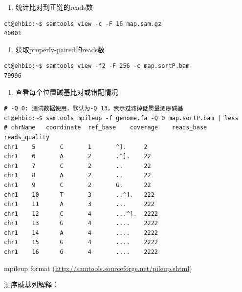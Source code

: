 \documentclass[]{article}
\providecommand{\tightlist}{%
  \setlength{\itemsep}{0pt}\setlength{\parskip}{0pt}}
\numberwithin{figure}{section}
\numberwithin{table}{section}
\begin{document}
\begin{enumerate}
\def\labelenumi{\arabic{enumi}.}
\setcounter{enumi}{8}
\tightlist
\item
  统计比对到正链的reads数
\end{enumerate}

\begin{verbatim}
ct@ehbio:~$ samtools view -c -F 16 map.sam.gz
40001
\end{verbatim}

\begin{enumerate}
\def\labelenumi{\arabic{enumi}.}
\setcounter{enumi}{9}
\tightlist
\item
  获取properly-paired的reads数
\end{enumerate}

\begin{verbatim}
ct@ehbio:~$ samtools view -f2 -F 256 -c map.sortP.bam
79996
\end{verbatim}

\begin{enumerate}
\def\labelenumi{\arabic{enumi}.}
\setcounter{enumi}{10}
\tightlist
\item
  查看每个位置碱基比对或错配情况
\end{enumerate}

\begin{verbatim}
# -Q 0: 测试数据使用，默认为-Q 13，表示过滤掉低质量测序碱基
ct@ehbio:~$ samtools mpileup -f genome.fa -Q 0 map.sortP.bam | less
# chrName	coordinate	ref_base	coverage	reads_base	reads_quality
chr1    5       C       1       ^].     2
chr1    6       A       2       .^].    22
chr1    7       C       2       ..      22
chr1    8       A       2       ..      22
chr1    9       C       2       G.      22
chr1    10      T       3       ..^].   222
chr1    11      A       3       ...     222
chr1    12      C       4       ...^].  2222
chr1    13      G       4       ....    2222
chr1    14      A       4       ....    2222
chr1    15      G       4       ....    2222
chr1    16      G       4       ....    2222
\end{verbatim}

mpileup format (\url{http://samtools.sourceforge.net/pileup.shtml})

测序碱基列解释：
\end{document}
